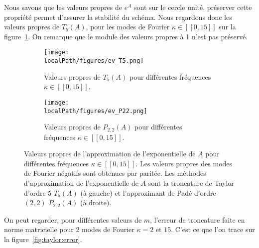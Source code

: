 Nous savons que les valeurs propres de $e^{A}$ sont sur le cercle unité, préserver cette propriété permet d'assurer la stabilité du schéma. Nous regardons donc les valeurs propres de $T_5(A)$, pour les modes de Fourier $\kappa\in[\![0,15]\!]$ sur la figure~\ref{fig:ev:T5}. On remarque que le module des valeurs propres à 1 n'est pas préservé.

\begin{figure}
  \begin{subfigure}{.5\textwidth}
    \centering
    \texttt{[image: \\localPath/figures/ev\_T5.png]}
    \caption{Valeurs propres de $T_5(A)$ pour différentes fréquences $\kappa\in[\![0,15]\!]$.}
    \label{fig:ev:T5}
  \end{subfigure}
  \begin{subfigure}{.5\textwidth}
    \texttt{[image: \\localPath/figures/ev\_P22.png]}
    \caption{Valeurs propres de $P_{2,2}(A)$ pour différentes fréquences $\kappa\in[\![0,15]\!]$.}
    \label{fig:ev:P22}
  \end{subfigure}
  \caption{Valeurs propres de l'approximation de l'exponentielle de $A$ pour différentes fréquences $\kappa\in[\![0,15]\!]$. Les valeurs propres des modes de Fourier négatifs sont obtenues par paritée. Les méthodes d'approximation de l'exponentielle de $A$ sont la troncature de Taylor d'ordre 5 $T_5(A)$ (à gauche) et l'approximant de Padé d'ordre $(2,2)$ $P_{2,2}(A)$ (à droite).}
\end{figure}

On peut regarder, pour différentes valeurs de $m$, l'erreur de troncature faite en norme matricielle pour 2 modes de Fourier $\kappa=2$ et $15$. C'est ce que l'on trace sur la figure~\ref{fig:taylor:error}.


